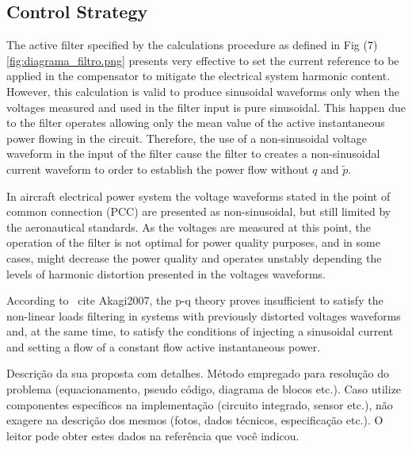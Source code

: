 \subsection{Control Strategy}

The active filter specified by the calculations procedure as defined in Fig (7) \ref{fig:diagrama_filtro.png} presents very effective to set the current reference to be applied in the compensator to mitigate the electrical system harmonic content. However, this calculation is valid to produce sinusoidal waveforms only when the voltages measured and used in the filter input is pure sinusoidal. This happen due to the filter operates allowing only the mean value of the active instantaneous power flowing in the circuit. Therefore, the use of a non-sinusoidal voltage waveform in the input of the filter cause the filter to creates a non-sinusoidal current waveform to order to establish the power flow without $q$ and $\tilde{p}$.

In aircraft electrical power system the voltage waveforms stated in the point of common connection (PCC) are presented as non-sinusoidal, but still limited by the aeronautical standards. As the voltages are measured at this point, the operation of the filter is not optimal for power quality purposes, and in some cases, might decrease the power quality and operates unstably depending the levels of harmonic distortion presented in the voltages waveforms.

According to \ cite {Akagi2007}, the p-q theory proves insufficient to satisfy the non-linear loads filtering in systems with previously distorted voltages waveforms and, at the same time, to satisfy the conditions of injecting a sinusoidal current and setting a flow of a constant flow active instantaneous power.  
 

Descrição da sua proposta com detalhes. Método empregado para resolução do problema (equacionamento, pseudo código, diagrama de blocos etc.).
Caso utilize componentes específicos na implementação (circuito integrado, sensor etc.), não exagere na descrição dos mesmos (fotos, dados técnicos, especificação etc.). O leitor pode obter estes dados na referência que você indicou.	